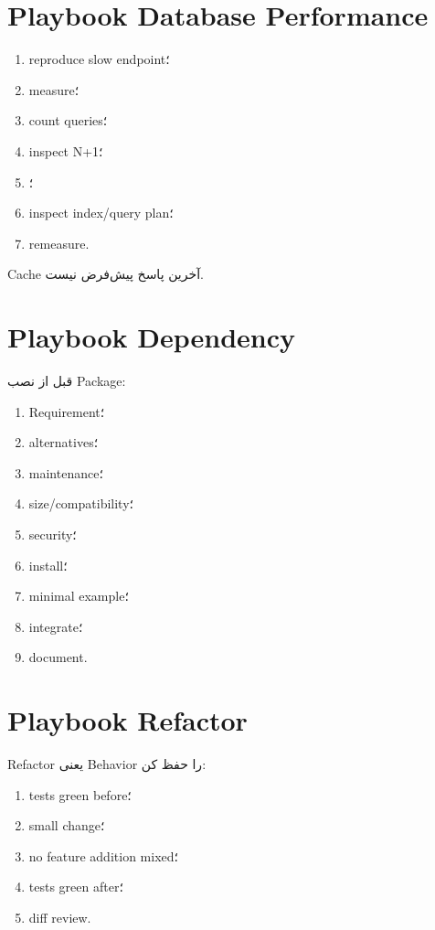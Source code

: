 \section{Playbook Database Performance}

\begin{enumerate}
  \item reproduce slow endpoint؛
  \item measure؛
  \item count queries؛
  \item inspect N+1؛
  \item {}؛
  \item inspect index/query plan؛
  \item remeasure.
\end{enumerate}

Cache آخرین پاسخ پیش‌فرض نیست.

\section{Playbook Dependency}

قبل از نصب Package:
\begin{enumerate}
  \item Requirement؛
  \item alternatives؛
  \item maintenance؛
  \item size/compatibility؛
  \item security؛
  \item install؛
  \item minimal example؛
  \item integrate؛
  \item document.
\end{enumerate}

\section{Playbook Refactor}

Refactor یعنی Behavior را حفظ کن:
\begin{enumerate}
  \item tests green before؛
  \item small change؛
  \item no feature addition mixed؛
  \item tests green after؛
  \item diff review.
\end{enumerate}

